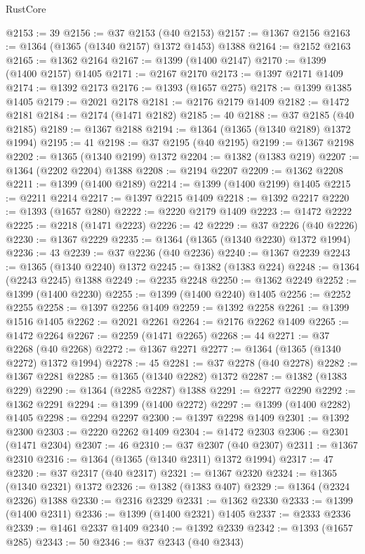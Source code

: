 \begin{lexlean}{RustCore}
\begin{coremodule}
@2153 := 39
@2156 := @37 @2153 (@40 @2153)
@2157 := @1367 @2156
@2163 := @1364 (@1365 (@1340 @2157) @1372 @1453) @1388
@2164 := @2152 @2163
@2165 := @1362 @2164
@2167 := @1399 (@1400 @2147)
@2170 := @1399 (@1400 @2157) @1405
@2171 := @2167 @2170
@2173 := @1397 @2171 @1409
@2174 := @1392 @2173
@2176 := @1393 (@1657 @275)
@2178 := @1399 @1385 @1405
@2179 := @2021 @2178
@2181 := @2176 @2179 @1409
@2182 := @1472 @2181
@2184 := @2174 (@1471 @2182)
@2185 := 40
@2188 := @37 @2185 (@40 @2185)
@2189 := @1367 @2188
@2194 := @1364 (@1365 (@1340 @2189) @1372 @1994)
@2195 := 41
@2198 := @37 @2195 (@40 @2195)
@2199 := @1367 @2198
@2202 := @1365 (@1340 @2199) @1372
@2204 := @1382 (@1383 @219)
@2207 := @1364 (@2202 @2204) @1388
@2208 := @2194 @2207
@2209 := @1362 @2208
@2211 := @1399 (@1400 @2189)
@2214 := @1399 (@1400 @2199) @1405
@2215 := @2211 @2214
@2217 := @1397 @2215 @1409
@2218 := @1392 @2217
@2220 := @1393 (@1657 @280)
@2222 := @2220 @2179 @1409
@2223 := @1472 @2222
@2225 := @2218 (@1471 @2223)
@2226 := 42
@2229 := @37 @2226 (@40 @2226)
@2230 := @1367 @2229
@2235 := @1364 (@1365 (@1340 @2230) @1372 @1994)
@2236 := 43
@2239 := @37 @2236 (@40 @2236)
@2240 := @1367 @2239
@2243 := @1365 (@1340 @2240) @1372
@2245 := @1382 (@1383 @224)
@2248 := @1364 (@2243 @2245) @1388
@2249 := @2235 @2248
@2250 := @1362 @2249
@2252 := @1399 (@1400 @2230)
@2255 := @1399 (@1400 @2240) @1405
@2256 := @2252 @2255
@2258 := @1397 @2256 @1409
@2259 := @1392 @2258
@2261 := @1399 @1516 @1405
@2262 := @2021 @2261
@2264 := @2176 @2262 @1409
@2265 := @1472 @2264
@2267 := @2259 (@1471 @2265)
@2268 := 44
@2271 := @37 @2268 (@40 @2268)
@2272 := @1367 @2271
@2277 := @1364 (@1365 (@1340 @2272) @1372 @1994)
@2278 := 45
@2281 := @37 @2278 (@40 @2278)
@2282 := @1367 @2281
@2285 := @1365 (@1340 @2282) @1372
@2287 := @1382 (@1383 @229)
@2290 := @1364 (@2285 @2287) @1388
@2291 := @2277 @2290
@2292 := @1362 @2291
@2294 := @1399 (@1400 @2272)
@2297 := @1399 (@1400 @2282) @1405
@2298 := @2294 @2297
@2300 := @1397 @2298 @1409
@2301 := @1392 @2300
@2303 := @2220 @2262 @1409
@2304 := @1472 @2303
@2306 := @2301 (@1471 @2304)
@2307 := 46
@2310 := @37 @2307 (@40 @2307)
@2311 := @1367 @2310
@2316 := @1364 (@1365 (@1340 @2311) @1372 @1994)
@2317 := 47
@2320 := @37 @2317 (@40 @2317)
@2321 := @1367 @2320
@2324 := @1365 (@1340 @2321) @1372
@2326 := @1382 (@1383 @407)
@2329 := @1364 (@2324 @2326) @1388
@2330 := @2316 @2329
@2331 := @1362 @2330
@2333 := @1399 (@1400 @2311)
@2336 := @1399 (@1400 @2321) @1405
@2337 := @2333 @2336
@2339 := @1461 @2337 @1409
@2340 := @1392 @2339
@2342 := @1393 (@1657 @285)
@2343 := 50
@2346 := @37 @2343 (@40 @2343)

\end{coremodule}
\end{lexlean}
